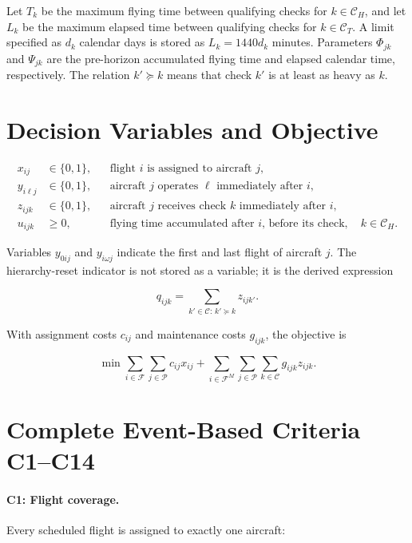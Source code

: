 \documentclass[11pt,a4paper]{article}
\newcommand{\F}{\mathcal{F}}
\newcommand{\Pset}{\mathcal{P}}
\newcommand{\Cset}{\mathcal{C}}
\begin{document}
Let $T_k$ be the maximum flying time between qualifying checks for
$k\in\Cset_H$, and let $L_k$ be the maximum elapsed time between qualifying
checks for $k\in\Cset_T$. A limit specified as $d_k$ calendar days is stored as
$L_k=1440d_k$ minutes. Parameters $\Phi_{jk}$ and $\Psi_{jk}$ are the
pre-horizon accumulated flying time and elapsed calendar time, respectively.
The relation $k'\succeq k$ means that check $k'$ is at least as heavy as $k$.

\section{Decision Variables and Objective}

\begin{align}
  x_{ij}&\in\{0,1\},
  &&\text{flight $i$ is assigned to aircraft $j$},
  \label{eq:x_definition}\\
  y_{i\ell j}&\in\{0,1\},
  &&\text{aircraft $j$ operates $\ell$ immediately after $i$},
  \label{eq:y_definition}\\
  z_{ijk}&\in\{0,1\},
  &&\text{aircraft $j$ receives check $k$ immediately after $i$},
  \label{eq:z_definition}\\
  u_{ijk}&\geq0,
  &&\text{flying time accumulated after $i$, before its check},
  \quad k\in\Cset_H.
  \label{eq:u_definition}
\end{align}

Variables $y_{0ij}$ and $y_{i\omega j}$ indicate the first and last flight of
aircraft $j$. The hierarchy-reset indicator is not stored as a variable; it is
the derived expression

\begin{equation}
  q_{ijk}=\sum_{k'\in\Cset:\,k'\succeq k}z_{ijk'}.
  \label{eq:q_definition}
\end{equation}

With assignment costs $c_{ij}$ and maintenance costs $g_{ijk}$, the objective
is

\begin{equation}
  \min
  \sum_{i\in\F}\sum_{j\in\Pset}c_{ij}x_{ij}
  +\sum_{i\in\F^M}\sum_{j\in\Pset}\sum_{k\in\Cset}g_{ijk}z_{ijk}.
  \label{eq:event_objective}
\end{equation}

\section{Complete Event-Based Criteria C1--C14}

\paragraph{C1: Flight coverage.}
Every scheduled flight is assigned to exactly one aircraft:
\end{document}
